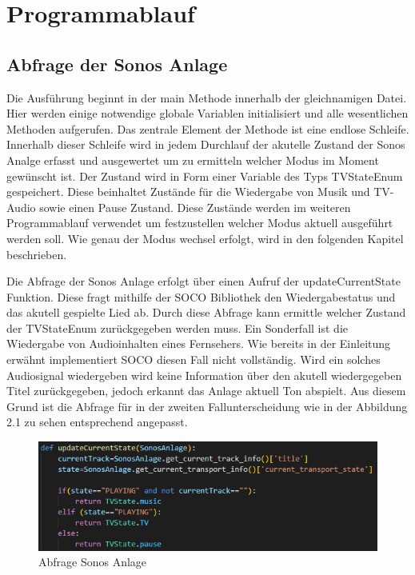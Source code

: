 \chapter{Programmablauf}
\section{Abfrage der Sonos Anlage}
Die Ausführung beginnt in der main Methode innerhalb der gleichnamigen Datei. Hier werden einige notwendige globale Variablen initialisiert und alle wesentlichen Methoden
aufgerufen. Das zentrale Element der Methode ist eine endlose Schleife. Innerhalb dieser Schleife wird in jedem Durchlauf der akutelle Zustand der Sonos Analge erfasst 
und ausgewertet um zu ermitteln welcher Modus im Moment gewünscht ist. Der Zustand wird in Form einer Variable des Typs TVStateEnum gespeichert. 
Diese beinhaltet Zustände für die Wiedergabe von Musik und TV-Audio sowie einen Pause Zustand. Diese Zustände werden im weiteren Programmablauf verwendet um festzustellen
welcher Modus aktuell ausgeführt werden soll. Wie genau der Modus wechsel erfolgt, wird in den folgenden Kapitel beschrieben.

Die Abfrage der Sonos Anlage erfolgt über einen Aufruf der updateCurrentState Funktion. Diese fragt mithilfe der SOCO Bibliothek den Wiedergabestatus und
das akutell gespielte Lied ab. Durch diese Abfrage kann ermittle welcher Zustand der TVStateEnum zurückgegeben werden muss. 
Ein Sonderfall ist die Wiedergabe von Audioinhalten eines Fernsehers. Wie bereits in der Einleitung erwähnt implementiert SOCO diesen Fall nicht vollständig.
Wird ein solches Audiosignal wiedergeben wird keine Information über den akutell wiedergegeben Titel zurückgegeben, jedoch erkannt das Anlage aktuell Ton abspielt. 
Aus diesem Grund ist die Abfrage für in der zweiten Fallunterscheidung wie in der Abbildung 2.1 zu sehen entsprechend angepasst.

\begin{figure}[ht]
    \centering
    \includegraphics[scale=0.5]{UpdateCurrentState.png}
    \caption{Abfrage Sonos Anlage}
    \label{UpdateCurrentState}
\end{figure}

